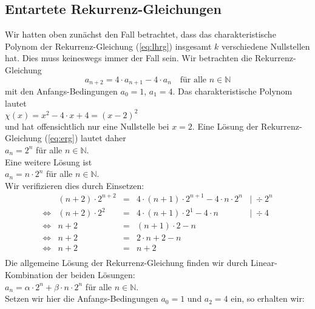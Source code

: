 \subsection{Entartete Rekurrenz-Gleichungen}
Wir hatten oben zun\"achst den Fall betrachtet, dass das charakteristische Polynom der
Rekurrenz-Gleichung (\ref{eq:lhrg}) insgesamt $k$ verschiedene Nullstellen hat.   Dies muss
keineswegs immer der Fall sein.  Wir betrachten die Rekurrenz-Gleichung 
\begin{equation}
  \label{eq:erg}
  a_{n+2} = 4 \cdot a_{n+1} - 4 \cdot a_n \quad \mbox{f\"ur alle $n \in \mathbb{N}$} 
\end{equation}
 mit den Anfangs-Bedingungen $a_0 = 1$, $a_1 = 4$.  Das charakteristische Polynom lautet \\[0.1cm]
\hspace*{1.3cm} $\chi(x) = x^2 - 4 \cdot x + 4 = (x - 2)^2$ \\[0.1cm]
und hat offensichtlich nur eine Nullstelle bei $x = 2$.   Eine L\"osung der
Rekurrenz-Gleichung (\ref{eq:erg}) lautet daher \\[0.1cm]
\hspace*{1.3cm} $a_n = 2^n$ \quad f\"ur alle $n \in \mathbb{N}$. \\[0.1cm]
Eine weitere L\"osung ist \\[0.1cm]
\hspace*{1.3cm} $a_n = n \cdot 2^n$ \quad f\"ur alle $n \in \mathbb{N}$.  \\[0.1cm]
Wir verifizieren dies durch Einsetzen: 
\[
\begin{array}{llcll}
 & (n+2) \cdot 2^{n+2} & = & 4 \cdot (n+1) \cdot 2^{n+1} - 4 \cdot n \cdot 2^n & \mid\; \div 2^n \\
\Leftrightarrow & 
   (n+2) \cdot 2^{2} & = & 4 \cdot (n+1) \cdot 2^{1} - 4 \cdot n  &  \mid\; \div 4 \\
\Leftrightarrow & n + 2 & = & (n + 1) \cdot 2 -  n  &  \\
\Leftrightarrow & n + 2 & = & 2 \cdot n + 2 -  n   \\
\Leftrightarrow & n + 2 & = & n + 2    \\
\end{array}
\]
Die allgemeine L\"osung der Rekurrenz-Gleichung finden wir durch Linear-Kombination der
beiden L\"osungen: \\[0.1cm]
\hspace*{1.3cm} $a_n = \alpha \cdot 2^n + \beta \cdot n \cdot 2^n$ \quad f\"ur alle $n \in \mathbb{N}$. \\[0.1cm]
Setzen wir hier die Anfangs-Bedingungen $a_0 = 1$ und $a_2 = 4$ ein, so erhalten wir:

